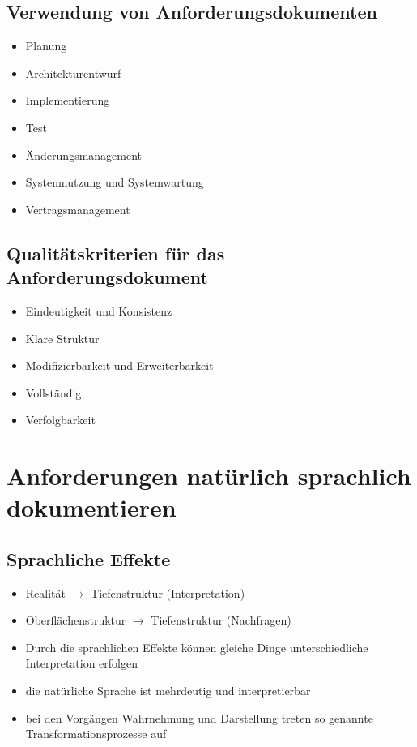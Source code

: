\documentclass{report}
\theoremstyle{definition}
\theoremstyle{example}
\begin{document}
\subsection{Verwendung von Anforderungsdokumenten}
\begin{itemize}
   \item Planung
   \item Architekturentwurf
   \item Implementierung
   \item Test
   \item Änderungsmanagement
   \item Systemnutzung und Systemwartung
   \item Vertragsmanagement
\end{itemize}

\subsection{Qualitätskriterien für das Anforderungsdokument}
\begin{itemize}
   \item Eindeutigkeit und Konsistenz
   \item Klare Struktur
   \item Modifizierbarkeit und Erweiterbarkeit
   \item Vollständig
   \item Verfolgbarkeit
\end{itemize}

\section{Anforderungen natürlich sprachlich dokumentieren}

\subsection{Sprachliche Effekte}
\begin{itemize}
   \item Realität $\rightarrow$ Tiefenstruktur (Interpretation)
   \item Oberflächenstruktur $\rightarrow$ Tiefenstruktur (Nachfragen)
   \item Durch die sprachlichen Effekte können gleiche Dinge unterschiedliche Interpretation erfolgen
   \item die natürliche Sprache ist mehrdeutig und interpretierbar
   \item bei den Vorgängen Wahrnehmung und Darstellung treten so genannte Transformationsprozesse auf
\end{itemize}
\end{document}
